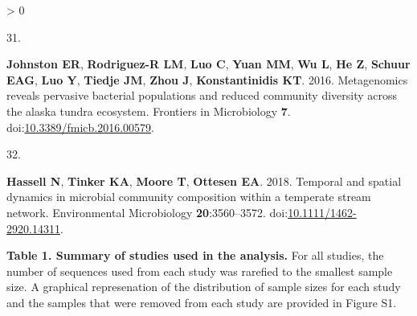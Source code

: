 \documentclass[
]{article}
\newlength{\cslhangindent}
\newlength{\csllabelwidth}
\newenvironment{CSLReferences}[3] %
 {%
  \setlength{\parindent}{0pt}
  \ifodd #1 \everypar{\setlength{\hangindent}{\cslhangindent}}\ignorespaces\fi
  \ifnum #2 > 0
  \setlength{\parskip}{#2\baselineskip}
  \fi
 }%
 {}
\newcommand{\CSLLeftMargin}[1]{\parbox[t]{\csllabelwidth}{#1}}
\newcommand{\CSLRightInline}[1]{\parbox[t]{\linewidth - \csllabelwidth}{#1}}
\begin{document}
\begin{CSLReferences}{0}{0}
\leavevmode\hypertarget{ref-Johnston2016}{}%
\CSLLeftMargin{31. }
\CSLRightInline{\textbf{Johnston ER}, \textbf{Rodriguez-R LM},
\textbf{Luo C}, \textbf{Yuan MM}, \textbf{Wu L}, \textbf{He Z},
\textbf{Schuur EAG}, \textbf{Luo Y}, \textbf{Tiedje JM}, \textbf{Zhou
J}, \textbf{Konstantinidis KT}. 2016. Metagenomics reveals pervasive
bacterial populations and reduced community diversity across the alaska
tundra ecosystem. Frontiers in Microbiology \textbf{7}.
doi:\href{https://doi.org/10.3389/fmicb.2016.00579}{10.3389/fmicb.2016.00579}.}

\leavevmode\hypertarget{ref-Hassell2018}{}%
\CSLLeftMargin{32. }
\CSLRightInline{\textbf{Hassell N}, \textbf{Tinker KA}, \textbf{Moore
T}, \textbf{Ottesen EA}. 2018. Temporal and spatial dynamics in
microbial community composition within a temperate stream network.
Environmental Microbiology \textbf{20}:3560--3572.
doi:\href{https://doi.org/10.1111/1462-2920.14311}{10.1111/1462-2920.14311}.}

\end{CSLReferences}

\newpage

\textbf{Table 1. Summary of studies used in the analysis.} For all
studies, the number of sequences used from each study was rarefied to
the smallest sample size. A graphical represenation of the distribution
of sample sizes for each study and the samples that were removed from
each study are provided in Figure S1.

\small
\end{document}
